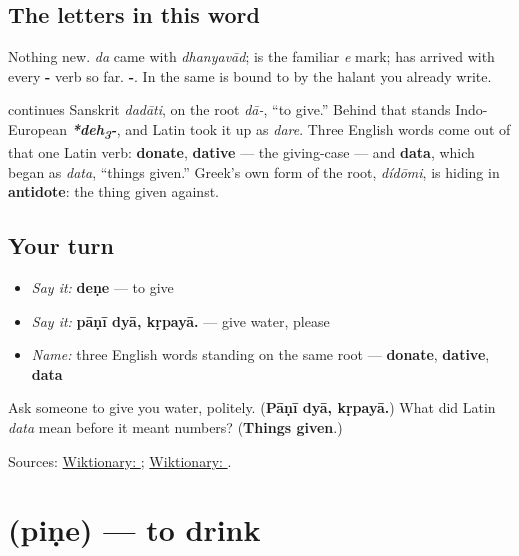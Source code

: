 \subsection*{The letters in this word}
Nothing new. \textbf{} \emph{da} came with \emph{dhanyavād}; \textbf{} is the familiar \emph{e} mark; \textbf{} has arrived with every \textbf{-} verb so far. \textbf{-}. In \textbf{} the same \textbf{} is bound to \textbf{} by the halant you already write.

\begin{cousinweb}
\textbf{} continues Sanskrit \textbf{} \emph{dadāti}, on the root \textbf{} \emph{dā-}, \textquotedblleft{}to give.\textquotedblright{} Behind that stands Indo-European \emph{\textbf{*deh\textsubscript{3}-}}, and Latin took it up as \emph{dare}. Three English words come out of that one Latin verb: \textbf{donate}, \textbf{dative} — the giving-case — and \textbf{data}, which began as \emph{data}, \textquotedblleft{}things given.\textquotedblright{} Greek's own form of the root, \emph{dídōmi}, is hiding in \textbf{antidote}: the thing given against.
\end{cousinweb}

\subsection*{Your turn}
\begin{itemize}
\raggedright
  \item \emph{Say it:} \textbf{deṇe} — to give
  \item \emph{Say it:} \textbf{pāṇī dyā, kṛpayā.} — give water, please
  \item \emph{Name:} three English words standing on the same root — \textbf{donate}, \textbf{dative}, \textbf{data}
\end{itemize}

\begin{tcolorbox}[breakable,colback=teal!4,colframe=teal!35!black,title={Before you move on}]
Ask someone to give you water, politely. (\textbf{Pāṇī dyā, kṛpayā.}) What did Latin \emph{data} mean before it meant numbers? (\textbf{Things given}.)

Sources: \href{https://en.wiktionary.org/wiki/\%E0\%A4\%A6\%E0\%A5\%87\%E0\%A4\%A3\%E0\%A5\%87}{Wiktionary: }; \href{https://en.wiktionary.org/wiki/\%E0\%A4\%A6\%E0\%A4\%BE}{Wiktionary: }.
\end{tcolorbox}
\section[\texorpdfstring{\mr{पिणे} (piṇe)}{पिणे (piṇe)}]{ (piṇe) — to drink}

